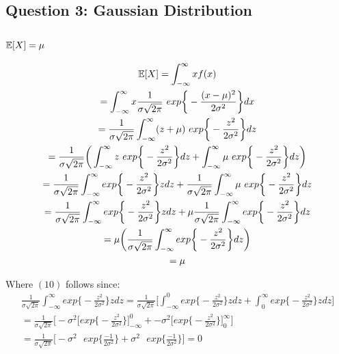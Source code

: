 \documentclass[11pt, oneside]{article}   	%
\begin{document}
\newpage{}
\subsection{Question 3: Gaussian Distribution}
\subsubsection{$\Bbb E[X] = \mu$}
\begin{gather}
\Bbb E[X] = \int_{-\infty}^{\infty} xf(x)\\
= \int_{-\infty}^{\infty} x \frac{1}{\sigma\sqrt{2\pi}} \text{ } exp\bigg\{- \frac{(x - \mu)^2}{2\sigma^2}\bigg\} dx\\
=  \frac{1}{\sigma\sqrt{2\pi}} \int_{-\infty}^{\infty} (z + \mu) \text{ } exp\bigg\{- \frac{z^2}{2\sigma^2}\bigg\} dz\\
= \frac{1}{\sigma\sqrt{2\pi}} \bigg(\int_{-\infty}^{\infty} z \text{ } exp\bigg\{- \frac{z^2}{2\sigma^2}\bigg\} dz + \int_{-\infty}^{\infty} \mu \text{ } exp\bigg\{- \frac{z^2}{2\sigma^2}\bigg\} dz\bigg) \\
= \frac{1}{\sigma\sqrt{2\pi}} \int_{-\infty}^{\infty} exp\bigg\{- \frac{z^2}{2\sigma^2}\bigg\} zdz +  \frac{1}{\sigma\sqrt{2\pi}} \int_{-\infty}^{\infty} \mu \text{ } exp\bigg\{- \frac{z^2}{2\sigma^2}\bigg\} dz \\
= \frac{1}{\sigma\sqrt{2\pi}} \int_{-\infty}^{\infty} exp\bigg\{- \frac{z^2}{2\sigma^2}\bigg\} zdz + \mu \frac{1}{\sigma\sqrt{2\pi}} \int_{-\infty}^{\infty} exp\bigg\{- \frac{z^2}{2\sigma^2}\bigg\} dz \\
= \mu \bigg( \frac{1}{\sigma\sqrt{2\pi}} \int_{-\infty}^{\infty} exp\bigg\{- \frac{z^2}{2\sigma^2}\bigg\} dz \bigg) \\
= \mu
\end{gather}

Where $(10)$ follows since: 
\begin{gather*}
\frac{1}{\sigma\sqrt{2\pi}} \int_{-\infty}^{\infty} exp\bigg\{- \frac{z^2}{2\sigma^2}\bigg\} zdz = \frac{1}{\sigma\sqrt{2\pi}}\bigg[  \int_{-\infty}^{0} exp\bigg\{- \frac{z^2}{2\sigma^2}\bigg\} zdz +  \int_{0}^{\infty} exp\bigg\{- \frac{z^2}{2\sigma^2}\bigg\} zdz \bigg]\\
= \frac{1}{\sigma\sqrt{2\pi}} \bigg[ - \sigma^2 \bigg[ exp\bigg\{ - \frac{z^2}{2\sigma^2} \bigg\} \bigg]_{-\infty}^{0} + - \sigma^2 \bigg[ exp\bigg\{ - \frac{z^2}{2\sigma^2} \bigg\} \bigg]_{0}^{\infty} \bigg]\\
= \frac{1}{\sigma\sqrt{2\pi}} \bigg[ -\sigma^2 \text{ } exp\bigg\{ \frac{-1}{2\sigma^2} \bigg\} + \sigma^2 \text{ } exp\bigg\{ \frac{-1}{2\sigma^2} \bigg\} \bigg] = 0
\end{gather*}
\end{document}
